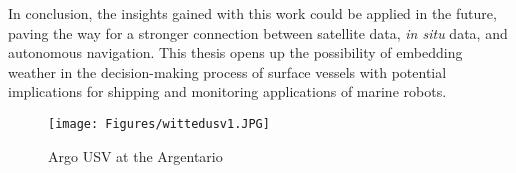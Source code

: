 In conclusion, the insights gained with this work could be applied in the future, paving the way for a stronger connection between satellite data, \textit{in situ} data, and autonomous navigation. This thesis opens up the possibility of embedding weather in the decision-making process of surface vessels with potential implications for shipping and monitoring applications of marine robots.
\vspace{0.5cm}
\begin{figure}[h]
	\centering
	\texttt{[image: Figures/wittedusv1.JPG]}
	\caption{Argo USV at the Argentario}
	\label{wittedargo}
\end{figure} 



